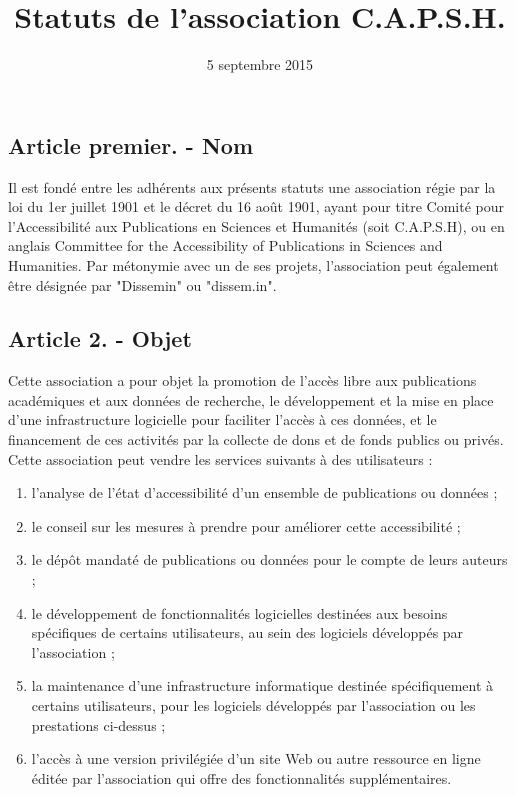 \documentclass[a4paper]{article}
\title{Statuts de l'association C.A.P.S.H.}
\date{5 septembre 2015}
\begin{document}
\maketitle

\subsection*{Article premier. - Nom}

Il est fondé entre les adhérents aux présents statuts une association régie par la loi du 1er juillet 1901 et le décret du 16 août 1901, ayant pour titre Comité pour l'Accessibilité aux Publications en Sciences et Humanités (soit C.A.P.S.H), ou en anglais
Committee for the Accessibility of Publications in Sciences and Humanities.
Par métonymie avec un de ses projets, l'association peut également être désignée par "Dissemin" ou "dissem.in".

\subsection*{Article 2. - Objet}

Cette association a pour objet la promotion de l'accès libre aux publications académiques et
aux données de recherche, le développement et la mise en place d'une infrastructure logicielle pour faciliter l'accès à ces données, et le financement de ces activités par la collecte de dons et de fonds publics ou privés.
Cette association peut vendre les services suivants à des utilisateurs :
\begin{enumerate}
    \item l'analyse de l'état d'accessibilité d'un ensemble de publications ou données ;
    \item le conseil sur les mesures à prendre pour améliorer cette accessibilité ;
    \item le dépôt mandaté de publications ou données pour le compte de leurs auteurs ;
    \item le développement de fonctionnalités logicielles destinées aux besoins spécifiques de certains utilisateurs, au sein des logiciels développés par l'association ;
    \item la maintenance d'une infrastructure informatique destinée spécifiquement à certains utilisateurs, pour les logiciels développés par l'association ou les prestations ci-dessus ;
    \item l'accès à une version privilégiée d'un site Web ou autre ressource en ligne éditée par l'association qui offre des fonctionnalités supplémentaires.
\end{enumerate}
\end{document}
